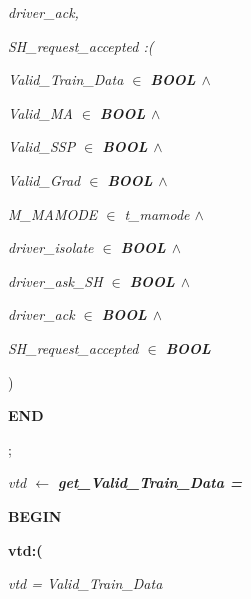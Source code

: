 \documentclass[11pt]{article}
\begin{document}
\begin{sloppypar}
\hspace*{0.40in}\it driver\_ack\rm ,

\hspace*{0.40in}\it SH\_request\_accepted \rm :\rm (

\hspace*{0.60in}\it Valid\_Train\_Data  $\in$ \hspace*{0.10in}\bf BOOL  $\land$ 

\hspace*{0.60in}\it Valid\_MA  $\in$  \bf BOOL  $\land$ 

\hspace*{0.60in}\it Valid\_SSP  $\in$  \bf BOOL  $\land$ 

\hspace*{0.60in}\it Valid\_Grad  $\in$ \hspace*{0.10in}\bf BOOL  $\land$ 

\hspace*{0.60in}\it M\_MAMODE  $\in$ \hspace*{0.10in}\it t\_mamode  $\land$ 

\hspace*{0.60in}\it driver\_isolate  $\in$  \bf BOOL  $\land$ 

\hspace*{0.60in}\it driver\_ask\_SH  $\in$  \bf BOOL  $\land$ 

\hspace*{0.60in}\it driver\_ack  $\in$  \bf BOOL  $\land$ 

\hspace*{0.60in}\it SH\_request\_accepted  $\in$  \bf BOOL

\hspace*{0.40in}\rm )

\hspace*{0.20in}\bf END

\hspace*{0.35in}

\hspace*{0.20in}\rm ;

\hspace*{0.20in}

\hspace*{0.20in}\it vtd  $\leftarrow$  \bf get\_Valid\_Train\_Data \rm = 

\hspace*{0.20in}\bf BEGIN

\hspace*{0.40in}\bf vtd\rm :\rm (

\hspace*{0.60in}\it vtd \rm = \it Valid\_Train\_Data


\end{sloppypar}
\end{document}
